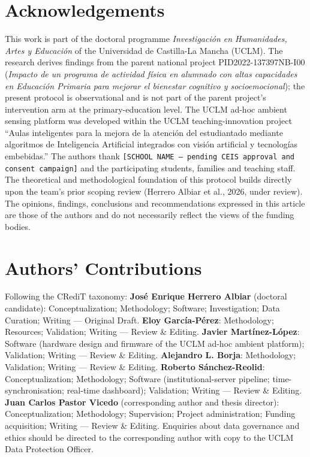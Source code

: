 
\section*{Acknowledgements}\label{sec:ack}

This work is part of the doctoral programme \emph{Investigación en Humanidades, Artes y Educación} of the Universidad de Castilla-La Mancha (UCLM). The research derives findings from the parent national project PID2022-137397NB-I00 (\emph{Impacto de un programa de actividad física en alumnado con altas capacidades en Educación Primaria para mejorar el bienestar cognitivo y socioemocional}); the present protocol is observational and is not part of the parent project's intervention arm at the primary-education level. The UCLM ad-hoc ambient sensing platform was developed within the UCLM teaching-innovation project ``Aulas inteligentes para la mejora de la atención del estudiantado mediante algoritmos de Inteligencia Artificial integrados con visión artificial y tecnologías embebidas.'' The authors thank \texttt{[SCHOOL NAME --- pending CEIS approval and consent campaign]} and the participating students, families and teaching staff. The theoretical and methodological foundation of this protocol builds directly upon the team’s prior scoping review (Herrero Albiar et al., 2026, under review). The opinions, findings, conclusions and recommendations expressed in this article are those of the authors and do not necessarily reflect the views of the funding bodies.

\section*{Authors' Contributions}\label{sec:credit}

Following the CRediT taxonomy: \textbf{José Enrique Herrero Albiar} (doctoral candidate): Conceptualization; Methodology; Software; Investigation; Data Curation; Writing --- Original Draft. \textbf{Eloy García-Pérez}: Methodology; Resources; Validation; Writing --- Review \& Editing. \textbf{Javier Martínez-López}: Software (hardware design and firmware of the UCLM ad-hoc ambient platform); Validation; Writing --- Review \& Editing. \textbf{Alejandro L. Borja}: Methodology; Validation; Writing --- Review \& Editing. \textbf{Roberto Sánchez-Reolid}: Conceptualization; Methodology; Software (institutional-server pipeline; time-synchronisation; real-time dashboard); Validation; Writing --- Review \& Editing. \textbf{Juan Carlos Pastor Vicedo} (corresponding author and thesis director): Conceptualization; Methodology; Supervision; Project administration; Funding acquisition; Writing --- Review \& Editing. Enquiries about data governance and ethics should be directed to the corresponding author with copy to the UCLM Data Protection Officer.

